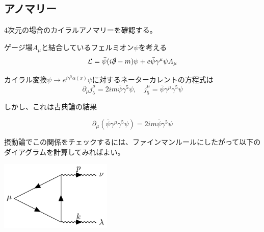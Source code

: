 \documentclass[
  unicode,a4paper,9pt,
  xcolor = {dvipsnames,svgnames},
  hyperref ={colorlinks=true,citecolor=Navy,linkcolor=NavyBlue,urlcolor=purple},
  ja=standard,lualatex
]{beamer}
\begin{document}
\begin{frame}[plain]
  \huge \secname
\end{frame}

\subsection{アノマリー}

\begin{frame}{\subsecname}

  4次元の場合のカイラルアノマリーを確認する。

  \pause
  \vspace*{10pt}

  ゲージ場$A_{\mu}$と結合しているフェルミオン$\psi$を考える
  \begin{equation}
    \mathcal{L}
    =
    \bar{\psi}(i\slashed{\partial}-m)\psi
    +
    e\bar{\psi}\gamma^{\mu}\psi A_{\mu}
    \nonumber
  \end{equation}

  \vspace*{10pt}

  カイラル変換$\psi\rightarrow e^{i\gamma^{5}\alpha(x)}\psi$に対するネーターカレントの方程式は
  \begin{equation}
    \partial_{\mu}j^{\mu}_{5}
    =
    2im\bar{\psi}\gamma^{5}\psi
    ,\quad
    j^{\mu}_{5}
    =
    \bar{\psi}\gamma^{\mu}\gamma^{5}\psi
    \nonumber
  \end{equation}

\end{frame}



\begin{frame}


  しかし、これは古典論の結果

  \begin{equation}
    \partial_{\mu}
    (\bar{\psi}\gamma^{\mu}\gamma^{5}\psi)
    =
    2im\bar{\psi}\gamma^{5}\psi
    \nonumber
  \end{equation}

  摂動論でこの関係をチェックするには、ファインマンルールにしたがって以下のダイアグラムを計算してみればよい\cite{Peskin:1995,Fujikawa:2001a}。

  \begin{center}
    \includegraphics[width=0.4\textwidth]{fig/feynman_diag.pdf}    
  \end{center}

\end{frame}
\end{document}
